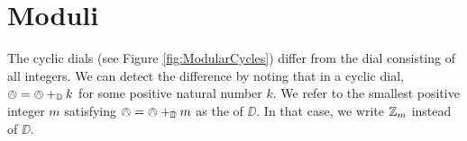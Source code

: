 \section*{Moduli}

The cyclic dials (see Figure \ref{fig:ModularCycles}) differ from the dial consisting of all integers. We can detect the difference by noting that in  a cyclic dial, $\owedge = \owedge +_{\mathbb D} k$ for some positive natural number $k$. We refer to the smallest positive integer $m$ satisfying $\owedge = \owedge +_{\mathbb D} m$ as the  of $\DD$. In that case, we write ${\mathbb Z}_m$ instead of $\DD$.




